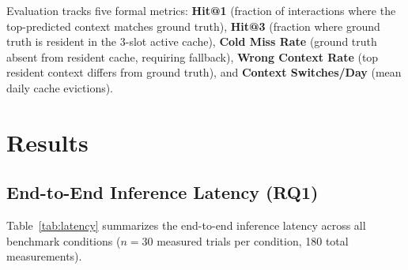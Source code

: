 \documentclass[journal]{IEEEtran}
\begin{document}
Evaluation tracks five formal metrics: \textbf{Hit@1} (fraction of interactions where the top-predicted context matches ground truth), \textbf{Hit@3} (fraction where ground truth is resident in the 3-slot active cache), \textbf{Cold Miss Rate} (ground truth absent from resident cache, requiring fallback), \textbf{Wrong Context Rate} (top resident context differs from ground truth), and \textbf{Context Switches/Day} (mean daily cache evictions).

\section{Results}
\label{sec:results}

\subsection{End-to-End Inference Latency (RQ1)}
\label{sec:results_latency}

Table~\ref{tab:latency} summarizes the end-to-end inference latency across all benchmark conditions ($n = 30$ measured trials per condition, 180 total measurements).

\begin{table}[htbp]
\centering
\caption{Inference latency decomposition (ms) across pipeline conditions. Prefill isolates the \texttt{llama\_decode()} forward pass; generation covers the autoregressive sampling loop. Both are measured via native-side \texttt{std::chrono} instrumentation. CAP\_KVC total includes cache restoration, prefill, and generation. All values: OnePlus~11R, Qwen2.5-0.5B-Instruct Q4\_K\_M, greedy sampling, max 64~output tokens, $n = 30$ trials.}
\label{tab:latency}
\end{table}
\end{document}
